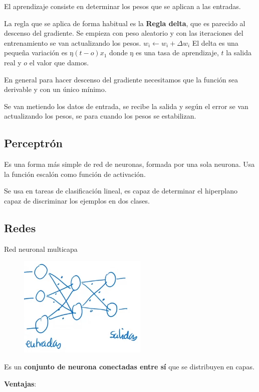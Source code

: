 \documentclass[12pt]{report} %
\begin{document}
El aprendizaje consiste en determinar los pesos que se aplican a las
entradas.

La regla que se aplica de forma habitual es la \textbf{Regla delta}, que
es parecido al descenso del gradiente. Se empieza con peso aleatorio y
con las iteraciones del entrenamiento se van actualizando los pesos.
\(w_i \leftarrow w_i+\Delta w_i\) El delta es una pequeña variación es
ŋ\((t-o)x_1\) donde ŋ es una tasa de aprendizaje, \(t\) la salida real y
\(o\) el valor que damos.

En general para hacer descenso del gradiente necesitamos que la función
sea derivable y con un único mínimo.

Se van metiendo los datos de entrada, se recibe la salida y según el
error se van actualizando los pesos, se para cuando los pesos se
estabilizan.

\subsection{Perceptrón}

Es una forma más simple de red de neuronas, formada por una sola
neurona. Usa la función escalón como función de activación.

Se usa en tareas de clasificación lineal, es capaz de determinar el
hiperplano capaz de discriminar los ejemplos en dos clases.

\subsection{Redes}

Red neuronal multicapa
\begin{figure}[H]
	{\includegraphics[scale=.85]{image-20210312102144206.png}}
\end{figure}

Es un \textbf{conjunto de neurona conectadas entre sí} que se
distribuyen en capas.

\textbf{Ventajas}:
\end{document}
